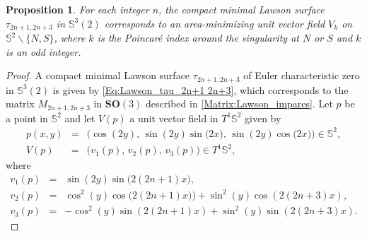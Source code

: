 \documentclass[reqno,11pt]{amsart}
\newtheorem{proposition}[theorem]{Proposition}
\begin{document}
{%




\begin{proposition}\label{Prop:ruled_Impar} For each integer $n$, the compact minimal Lawson surface $\tau_{2n+1,2n+3}$ in $\mathbb{S}^3(2)$ corresponds to an area-minimizing unit vector field $V_k$ on $\mathbb{S}^2\backslash\{N,S\}$, where $k$ is the Poincaré index around the singularity at $N$ or $S$ and $k$ is an odd integer.
\end{proposition} 

\begin{proof} A compact minimal Lawson surface $\tau_{2n+1,2n+3}$ of Euler characteristic zero in $\mathbb{S}^3(2)$ is given by \eqref{Eq:Lawson_tau_2n+1 2n+3}, which corresponds to the matrix $M_{2n+1,2n+3}$ in $\mathbf{SO}(3)$ described in \eqref{Matrix:Lawson_impares}. Let $p$ be a point in $\mathbb{S}^2$ and  let $V(p)$ a unit vector field in $T^1\mathbb{S}^2$ given by %
\begin{eqnarray}\label{Eq:ponto_impares}
    p(x,y) &=& \bigg(\cos(2y), \,  \sin(2y)\sin\big(2x\big), \, \sin(2y)\cos\big(2x\big)\bigg) \in \mathbb{S}^2 ,\\ 
    V(p) &=& \bigg( v_1(p), \,  v_2(p), \, v_3(p) \bigg) \in T^1\mathbb{S}^2, \label{Eq:vetor_impares}
\end{eqnarray}
where \begin{eqnarray*}
    v_1(p) &=& \sin(2y)\sin\big(2(2n+1)x \big), \\
    v_2(p) &=& \cos^2(y)\cos\big(2(2n+1)x)\big) + \sin^2(y)\cos(2(2n+3)x),\\ 
    v_3(p) &=& -\cos^2(y)\sin(2(2n+1)x)+ \sin^2(y)\sin(2(2n+3)x).
\end{eqnarray*}


\end{proof}}
\end{document}
